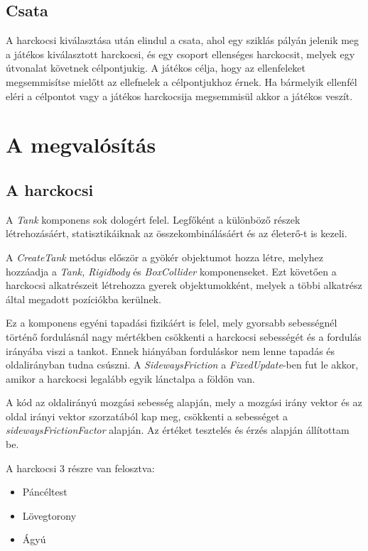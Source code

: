 \documentclass[
]{thesis-ekf}
\theoremstyle{definition}
\theoremstyle{remark}
\begin{document}
\subsection{Csata}

A harckocsi kiválasztása után elindul a csata, ahol egy sziklás pályán jelenik meg a játékos kiválasztott harckocsi, és egy csoport ellenséges harckocsit, melyek egy útvonalat követnek célpontjukig. A játékos célja, hogy az ellenfeleket megsemmisítse mielőtt az ellefnelek a célpontjukhoz érnek. Ha bármelyik ellenfél eléri a célpontot vagy a játékos harckocsija megsemmisül akkor a játékos veszít.

\section{A megvalósítás}

\subsection{A harckocsi}

A \emph{Tank} komponens sok dologért felel. Legfőként a különböző részek létrehozásáért, statisztikáiknak az összekombinálásáért és az életerő-t is kezeli.



A \emph{CreateTank} metódus először a gyökér objektumot hozza létre, melyhez hozzáadja a \emph{Tank, Rigidbody} és \emph{BoxCollider} komponenseket. Ezt követően a harckocsi alkatrészeit létrehozza gyerek objektumokként, melyek a többi alkatrész által megadott pozíciókba kerülnek.

Ez a komponens egyéni tapadási fizikáért is felel, mely gyorsabb sebességnél történő fordulásnál nagy mértékben csökkenti a harckocsi sebességét és a fordulás irányába viszi a tankot. Ennek hiányában forduláskor nem lenne tapadás és oldalirányban tudna csúszni. A \emph{SidewaysFriction} a \emph{FixedUpdate}-ben fut le akkor, amikor a harckocsi legalább egyik lánctalpa a földön van.



A kód az oldalirányú mozgási sebesség alapján, mely a mozgási irány vektor és az oldal irányi vektor szorzatából kap meg, csökkenti a sebességet a \emph{sidewaysFrictionFactor} alapján. Az értéket tesztelés és érzés alapján állítottam be.

A harckocsi 3 részre van felosztva:
\begin{itemize}
    \item Páncéltest
    \item Lövegtorony
    \item Ágyú
\end{itemize}
\end{document}
